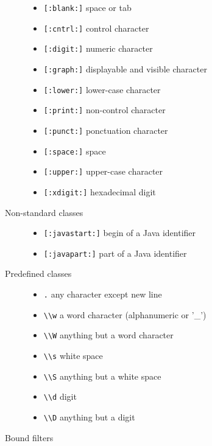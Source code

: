 \begin{description}
\begin{itemize}
    \item \verb![:blank:]!            space or tab
    \item \verb![:cntrl:]!            control character
    \item \verb![:digit:]!            numeric character
    \item \verb![:graph:]!            displayable and visible character
    \item \verb![:lower:]!            lower-case character
    \item \verb![:print:]!            non-control character
    \item \verb![:punct:]!            ponctuation character
    \item \verb![:space:]!            space
    \item \verb![:upper:]!            upper-case character
    \item \verb![:xdigit:]!           hexadecimal digit
    \end{itemize}
\item[Non-standard classes]
    \mbox{}\begin{itemize}
    \item \verb![:javastart:]!        begin of a Java identifier
    \item \verb![:javapart:]!         part of a Java identifier
    \end{itemize}
\item[Predefined classes]
    \mbox{}\begin{itemize}
    \item \verb!.!   any character except new line
    \item \verb!\\w! a word character (alphanumeric or '\_') %
    \item \verb!\\W! anything but a word character
    \item \verb!\\s! white space
    \item \verb!\\S! anything but a white space
    \item \verb!\\d! digit
    \item \verb!\\D! anything but a digit
    \end{itemize}
\item[Bound filters]
    \mbox{}\begin{itemize}

\end{itemize}
\end{description}
